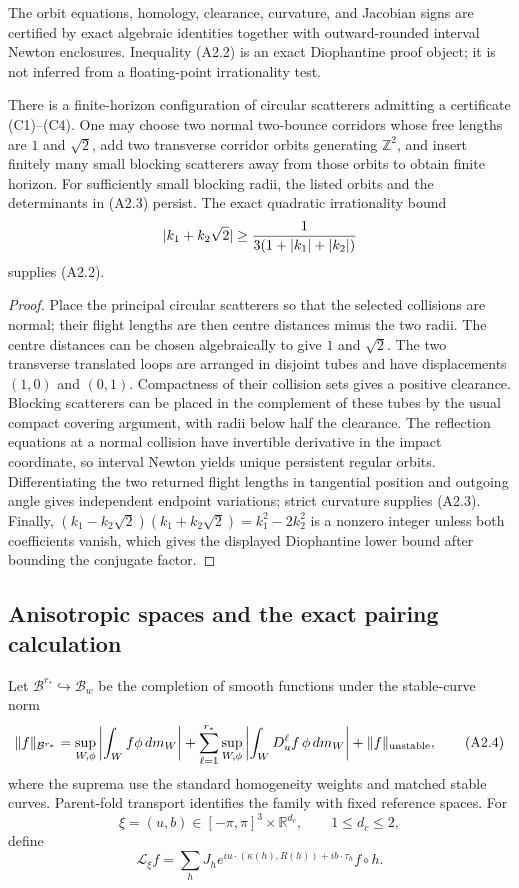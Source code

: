 The orbit equations, homology, clearance, curvature, and Jacobian signs are
certified by exact algebraic identities together with outward-rounded
interval Newton enclosures.  Inequality (A2.2) is an exact Diophantine proof
object; it is not inferred from a floating-point irrationality test.

\begin{proposition}
\label{prop:r27-a2-nonempty}
There is a finite-horizon configuration of circular scatterers admitting a
certificate (C1)--(C4).  One may choose two normal two-bounce corridors whose
free lengths are $1$ and $\sqrt2$, add two transverse corridor orbits
generating $\mathbb Z^2$, and insert finitely many small blocking scatterers
away from those orbits to obtain finite horizon.  For sufficiently small
blocking radii, the listed orbits and the determinants in (A2.3) persist.
The exact quadratic irrationality bound
\[
 |k_1+k_2\sqrt2|\ge {1\over 3(1+|k_1|+|k_2|)}
\]
supplies (A2.2).
\end{proposition}

\begin{proof}
Place the principal circular scatterers so that the selected collisions are
normal; their flight lengths are then centre distances minus the two radii.
The centre distances can be chosen algebraically to give $1$ and $\sqrt2$.
The two transverse translated loops are arranged in disjoint tubes and have
displacements $(1,0)$ and $(0,1)$.  Compactness of their collision sets gives
a positive clearance.  Blocking scatterers can be placed in the complement
of these tubes by the usual compact covering argument, with radii below half
the clearance.  The reflection equations at a normal collision have
invertible derivative in the impact coordinate, so interval Newton yields
unique persistent regular orbits.  Differentiating the two returned flight
lengths in tangential position and outgoing angle gives independent endpoint
variations; strict curvature supplies (A2.3).  Finally,
$(k_1-k_2\sqrt2)(k_1+k_2\sqrt2)=k_1^2-2k_2^2$ is a nonzero integer unless both
coefficients vanish, which gives the displayed Diophantine lower bound after
bounding the conjugate factor.
\end{proof}

\subsection{Anisotropic spaces and the exact pairing calculation}

Let $\mathcal B^{r_*}\hookrightarrow\mathcal B_w$ be the completion of smooth
functions under the stable-curve norm
\[
 \|f\|_{\mathcal B^{r_*}}
 =\sup_{W,\phi}\left|\int_W f\phi\,dm_W\right|
 +\sum_{\ell=1}^{r_*}\sup_{W,\phi}
  \left|\int_W D_u^\ell f\,\phi\,dm_W\right|
 +\|f\|_{\rm unstable},                                  \tag{A2.4}
\]
where the suprema use the standard homogeneity weights and matched stable
curves.  Parent-fold transport identifies the family with fixed reference
spaces.  For
\[
 \xi=(u,b)\in[-\pi,\pi]^3\times\mathbb R^{d_c},
 \qquad 1\le d_c\le2,
\]
define
\[
 \mathcal L_\xi f
 =\sum_hJ_he^{iu\cdot(\kappa(h),R(h))+ib\cdot\tau_h}f\circ h.             \tag{A2.5}
\]

